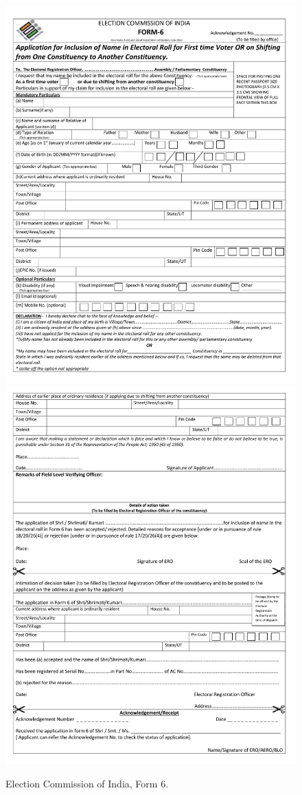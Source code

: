 \documentclass[
  11.5pt,
]{article}
\begin{document}
\begin{figure}
\includegraphics[width=0.5\linewidth]{pic-form-6-p1} \includegraphics[width=0.5\linewidth]{pic-form-6-p2} \caption{Election Commission of India, Form 6.}\label{fig:unnamed-chunk-27}
\end{figure}
\end{document}
